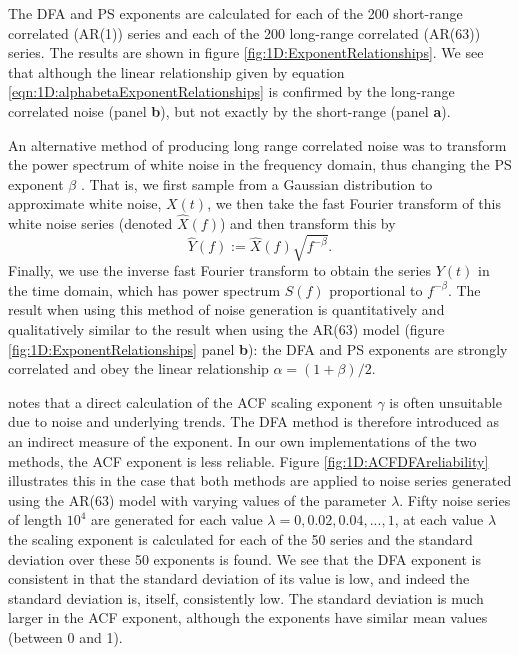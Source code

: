 {The DFA and PS exponents are calculated for each of the 200 short-range correlated (AR(1)) series and each of the 200 long-range correlated (AR(63)) series. The results are shown in figure \ref{fig:1D:ExponentRelationships}. We see that although the linear relationship given by equation \ref{eqn:1D:alphabetaExponentRelationships} is confirmed by the long-range correlated noise (panel {\bf b}), but not exactly by the short-range (panel {\bf a}).

An alternative method of producing long range correlated noise was to transform the power spectrum of white noise in the frequency domain, thus changing the PS exponent $\beta$ \citep{makse1996}. That is, we first sample from a Gaussian distribution to approximate white noise, $X(t)$, we then take the fast Fourier transform of this white noise series (denoted $\hat{X}(f)$) and then transform this by
	\begin{equation} 
	\label{eqn:1D:creatingColouredNoise}
		\hat{Y}(f) := \hat{X}(f)\sqrt{f^{-\beta}}.
	\end{equation}
Finally, we use the inverse fast Fourier transform to obtain the series $Y(t)$ in the time domain, which has power spectrum $S(f)$ proportional to $f^{-\beta}$. The result when using this method of noise generation is quantitatively and qualitatively similar to the result when using the AR(63) model (figure \ref{fig:1D:ExponentRelationships} panel {\bf b}): the DFA and PS exponents are strongly correlated and obey the linear relationship $\alpha = (1+\beta)/2$.


\citet{kantelhardt2001} notes that a direct calculation of the ACF scaling exponent $\gamma$ is often unsuitable due to noise and underlying trends. The DFA method is therefore introduced as an indirect measure of the exponent. In our own implementations of the two methods, the ACF exponent is less reliable. Figure \ref{fig:1D:ACFDFAreliability} illustrates this in the case that both methods are applied to noise series generated using the AR(63) model \citep{kasdin1995} with varying values of the parameter $\lambda$. Fifty noise series of length $10^4$ are generated for each value $\lambda = 0, 0.02, 0.04, ..., 1$, at each value $\lambda$ the scaling exponent is calculated for each of the 50 series and the standard deviation over these 50 exponents is found. We see that the DFA exponent is consistent in that the standard deviation of its value is low, and indeed the standard deviation is, itself, consistently low. The standard deviation is much larger in the ACF exponent, although the exponents have similar mean values (between 0 and 1).





}
